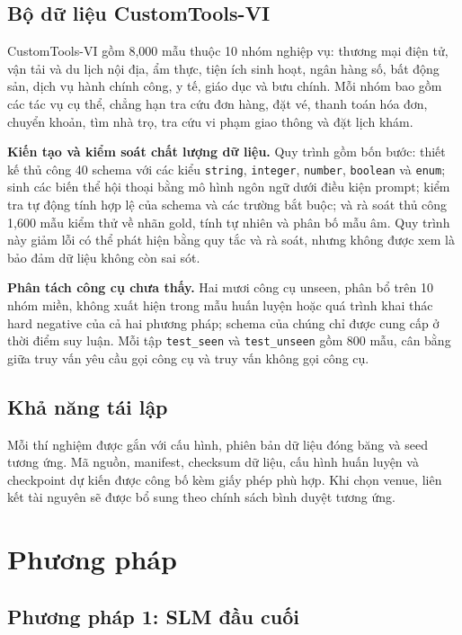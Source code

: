 \documentclass[10pt,twocolumn,a4paper]{article}
\begin{document}
\subsection{Bộ dữ liệu CustomTools-VI}
CustomTools-VI gồm 8,000 mẫu thuộc 10 nhóm nghiệp vụ: thương mại điện tử, vận tải và du lịch nội địa, ẩm thực, tiện ích sinh hoạt, ngân hàng số, bất động sản, dịch vụ hành chính công, y tế, giáo dục và bưu chính. Mỗi nhóm bao gồm các tác vụ cụ thể, chẳng hạn tra cứu đơn hàng, đặt vé, thanh toán hóa đơn, chuyển khoản, tìm nhà trọ, tra cứu vi phạm giao thông và đặt lịch khám.

\textbf{Kiến tạo và kiểm soát chất lượng dữ liệu.} Quy trình gồm bốn bước: thiết kế thủ công 40 schema với các kiểu \texttt{string}, \texttt{integer}, \texttt{number}, \texttt{boolean} và \texttt{enum}; sinh các biến thể hội thoại bằng mô hình ngôn ngữ dưới điều kiện prompt; kiểm tra tự động tính hợp lệ của schema và các trường bắt buộc; và rà soát thủ công 1,600 mẫu kiểm thử về nhãn gold, tính tự nhiên và phân bố mẫu âm. Quy trình này giảm lỗi có thể phát hiện bằng quy tắc và rà soát, nhưng không được xem là bảo đảm dữ liệu không còn sai sót.

\textbf{Phân tách công cụ chưa thấy.} Hai mươi công cụ unseen, phân bổ trên 10 nhóm miền, không xuất hiện trong mẫu huấn luyện hoặc quá trình khai thác hard negative của cả hai phương pháp; schema của chúng chỉ được cung cấp ở thời điểm suy luận. Mỗi tập \texttt{test\_seen} và \texttt{test\_unseen} gồm 800 mẫu, cân bằng giữa truy vấn yêu cầu gọi công cụ và truy vấn không gọi công cụ.

\subsection{Khả năng tái lập}
Mỗi thí nghiệm được gắn với cấu hình, phiên bản dữ liệu đóng băng và seed tương ứng. Mã nguồn, manifest, checksum dữ liệu, cấu hình huấn luyện và checkpoint dự kiến được công bố kèm giấy phép phù hợp. Khi chọn venue, liên kết tài nguyên sẽ được bổ sung theo chính sách bình duyệt tương ứng.



\section{Phương pháp}

\subsection{Phương pháp 1: SLM đầu cuối}
\end{document}
